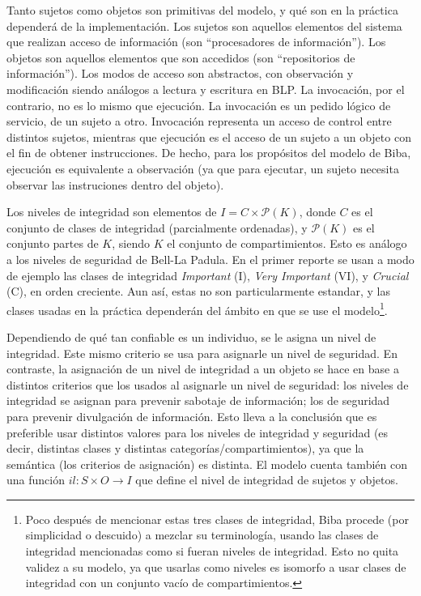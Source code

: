 \documentclass[spanish]{article}
\theoremstyle{definition}
\begin{document}
Tanto sujetos como objetos son primitivas del modelo, y qué son en la práctica
dependerá de la implementación. Los sujetos son aquellos elementos del sistema
que realizan acceso de información (son ``procesadores de información''). Los
objetos son aquellos elementos que son accedidos (son ``repositorios de
información''). Los modos de acceso son abstractos, con observación y
modificación siendo análogos a lectura y escritura en BLP. La invocación, por el
contrario, no es lo mismo que ejecución. La invocación es un pedido lógico de
servicio, de un sujeto a otro. Invocación representa un acceso de control entre
distintos sujetos, mientras que ejecución es el acceso de un sujeto a un objeto
con el fin de obtener instrucciones. De hecho, para los propósitos del modelo de
Biba, ejecución es equivalente a observación (ya que para ejecutar, un sujeto
necesita observar las instruciones dentro del objeto).

Los niveles de integridad son elementos de $I = C \times \mathcal{P}(K)$, donde
$C$ es el conjunto de clases de integridad (parcialmente ordenadas), y 
$\mathcal{P}(K)$ es el conjunto partes de $K$, siendo $K$ el conjunto de
compartimientos. Esto es análogo a los niveles de seguridad de Bell-La Padula.
En el primer reporte se usan a modo de ejemplo las clases de integridad
\textit{Important} (I), \textit{Very Important} (VI), y \textit{Crucial} (C), en
orden creciente. Aun así, estas no son particularmente estandar, y las clases
usadas en la práctica dependerán del ámbito en que se use el
modelo\footnote{Poco después de mencionar estas tres clases de integridad, Biba
  procede (por simplicidad o descuido) a mezclar su terminología, usando las
clases de integridad mencionadas como si fueran niveles de integridad. Esto no
quita validez a su modelo, ya que usarlas como niveles es isomorfo a usar clases
de integridad con un conjunto vacío de compartimientos.}. 

Dependiendo de qué tan confiable es un individuo, se le asigna un nivel
de integridad. Este mismo criterio se usa para asignarle un nivel de
seguridad. En contraste, la asignación de un nivel de integridad a un objeto se
hace en base a distintos criterios que los usados al asignarle un nivel de
seguridad: los niveles de integridad se asignan para prevenir sabotaje de
información; los de seguridad para prevenir divulgación de información. Esto
lleva a la conclusión que es preferible usar distintos valores para los niveles
de integridad y seguridad (es decir, distintas clases y distintas
categorías/compartimientos), ya que la semántica (los criterios de asignación)
es distinta. El modelo cuenta también con una función $il\colon S \times O \to I$ que define
el nivel de integridad de sujetos y objetos.
\end{document}
